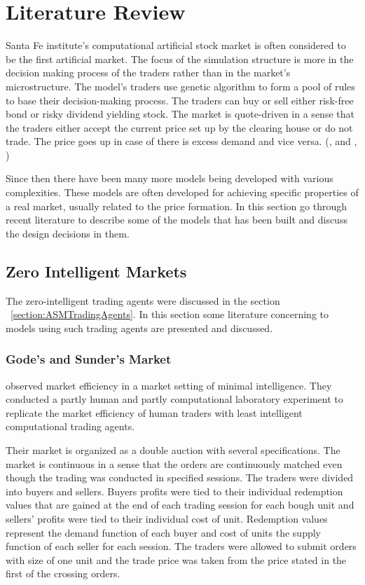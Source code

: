 \section{Literature Review}

Santa Fe institute's computational artificial stock 
market is often considered to be the first artificial market. 
The focus of the simulation structure is more in the 
decision making process of the traders rather than in the 
market's microstructure. The model's traders use 
genetic algorithm to form a pool of rules to base
their decision-making process. The traders can buy or
sell either risk-free bond or risky dividend yielding stock.
The market is quote-driven in a sense that the traders
either accept the current price set up by the clearing house
or do not trade. The price goes up in case of there is excess
demand and vice versa. (\citeauthor{SantaFe94}, \citeyear{SantaFe94} 
and \citeauthor{SantaFe99}, \citeyear{SantaFe99})

Since then there have been many more models being 
developed with various complexities. These models are often developed
for achieving specific properties of a real market, 
usually related to the price formation. In this section
go through recent literature to describe some of the models
that has been built and discuss the design decisions in them.



\subsection{Zero Intelligent Markets}


The zero-intelligent trading agents were discussed in the section 
~\ref{section:ASMTradingAgents}. In this section some literature
concerning to models using such trading agents are presented and
discussed.

\subsubsection{Gode's and Sunder's Market}
\citet{God93} observed market efficiency in a market setting
of minimal intelligence. They conducted a partly human and partly
computational laboratory experiment to replicate the market
efficiency of human traders with least intelligent computational
trading agents.

Their market is organized as a double auction with several
specifications. The market is continuous in a sense that the 
orders are continuously matched even though the trading was
conducted in specified sessions. The traders were divided 
into buyers and sellers. Buyers profits were tied to their 
individual redemption values that are gained at the end of
each trading session for each bough unit and sellers' profits
were tied to their individual cost of unit. Redemption values
represent the demand function of each buyer and cost of units 
the supply function of each seller for each session. The
traders were allowed to submit orders with size of one unit
and the trade price was taken from the price stated in the 
first of the crossing orders.

